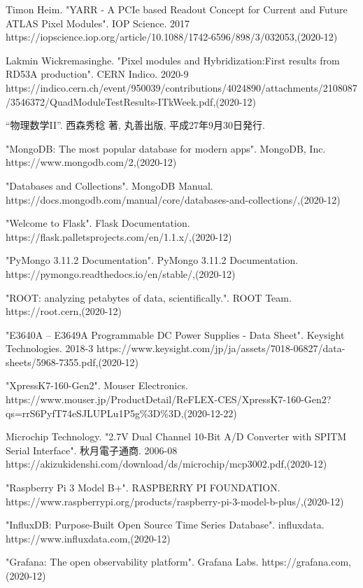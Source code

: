 \begin{thebibliography}{9}
Timon Heim. "YARR - A PCIe based Readout Concept for Current and Future ATLAS Pixel Modules". IOP Science. 2017
https://iopscience.iop.org/article/10.1088/1742-6596/898/3/032053,(2020-12)

Lakmin Wickremasinghe. "Pixel modules and Hybridization:First results from RD53A production". CERN Indico. 2020-9
https://indico.cern.ch/event/950039/contributions/4024890/attachments/2108087/3546372/QuadModuleTestResults-ITkWeek.pdf,(2020-12)

“物理数学II”.
西森秀稔 著, 丸善出版, 平成27年9月30日発行.

"MongoDB: The most popular database for modern apps". MongoDB, Inc. 
https://www.mongodb.com/2,(2020-12)

"Databases and Collections". MongoDB Manual. 
https://docs.mongodb.com/manual/core/databases-and-collections/,(2020-12)

"Welcome to Flask". Flask Documentation. 
https://flask.palletsprojects.com/en/1.1.x/,(2020-12)

"PyMongo 3.11.2 Documentation". PyMongo 3.11.2 Documentation.
https://pymongo.readthedocs.io/en/stable/,(2020-12)

"ROOT: analyzing petabytes of data, scientifically.". ROOT Team. 
https://root.cern,(2020-12)

"E3640A – E3649A Programmable DC Power Supplies - Data Sheet". Keysight Technologies. 2018-3
https://www.keysight.com/jp/ja/assets/7018-06827/data-sheets/5968-7355.pdf,(2020-12)

"XpressK7-160-Gen2". Mouser Electronics.
https://www.mouser.jp/ProductDetail/ReFLEX-CES/XpressK7-160-Gen2?qs=rrS6PyfT74eSJLUPLu1P5g\%3D\%3D,(2020-12-22)

Microchip Technology. "2.7V Dual Channel 10-Bit A/D Converter with SPITM Serial Interface". 秋月電子通商. 2006-08
https://akizukidenshi.com/download/ds/microchip/mcp3002.pdf,(2020-12)

"Raspberry Pi 3 Model B+". RASPBERRY PI FOUNDATION. 
https://www.raspberrypi.org/products/raspberry-pi-3-model-b-plus/,(2020-12)

"InfluxDB: Purpose-Built Open Source Time Series Database". influxdata. 
https://www.influxdata.com,(2020-12)

"Grafana: The open observability platform". Grafana Labs. 
https://grafana.com,(2020-12)


\end{thebibliography}
